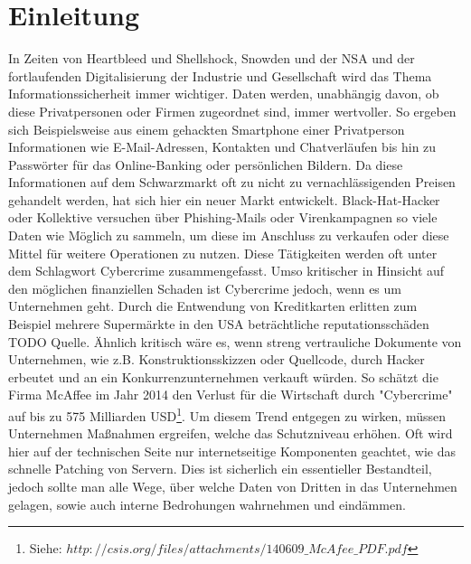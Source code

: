 \chapter{Einleitung}
In Zeiten von Heartbleed und Shellshock, Snowden und der NSA und der fortlaufenden Digitalisierung der Industrie und Gesellschaft wird das Thema Informationssicherheit immer wichtiger. Daten werden, unabhängig davon, ob diese Privatpersonen oder Firmen zugeordnet sind, immer wertvoller. So ergeben sich Beispielsweise aus einem gehackten Smartphone einer Privatperson Informationen wie E-Mail-Adressen, Kontakten und Chatverläufen bis hin zu Passwörter für das Online-Banking oder persönlichen Bildern. Da diese Informationen auf dem Schwarzmarkt oft zu nicht zu vernachlässigenden Preisen gehandelt werden, hat sich hier ein neuer Markt entwickelt. Black-Hat-Hacker oder Kollektive versuchen über Phishing-Mails oder Virenkampagnen so viele Daten wie Möglich zu sammeln, um diese im Anschluss zu verkaufen oder diese Mittel für weitere Operationen zu nutzen. Diese Tätigkeiten werden oft unter dem Schlagwort Cybercrime zusammengefasst. Umso kritischer in Hinsicht auf den möglichen finanziellen Schaden ist Cybercrime jedoch, wenn es um Unternehmen geht. Durch die Entwendung von Kreditkarten erlitten zum Beispiel mehrere Supermärkte in den USA beträchtliche reputationsschäden TODO Quelle. Ähnlich kritisch wäre es, wenn streng vertrauliche Dokumente von Unternehmen, wie z.B. Konstruktionsskizzen oder Quellcode, durch Hacker erbeutet und an ein Konkurrenzunternehmen verkauft würden. So schätzt die Firma McAffee im Jahr 2014 den Verlust für die Wirtschaft durch "Cybercrime" auf bis zu 575 Milliarden USD\footnote{Siehe: $http://csis.org/files/attachments/140609\_McAfee\_PDF.pdf$}. 
Um diesem Trend entgegen zu wirken, müssen Unternehmen Maßnahmen ergreifen, welche das Schutzniveau erhöhen. Oft wird hier auf der technischen Seite nur internetseitige Komponenten geachtet, wie das schnelle Patching von Servern. Dies ist sicherlich ein essentieller Bestandteil, jedoch sollte man alle Wege, über welche Daten von Dritten in das Unternehmen gelagen, sowie auch interne Bedrohungen wahrnehmen und eindämmen.